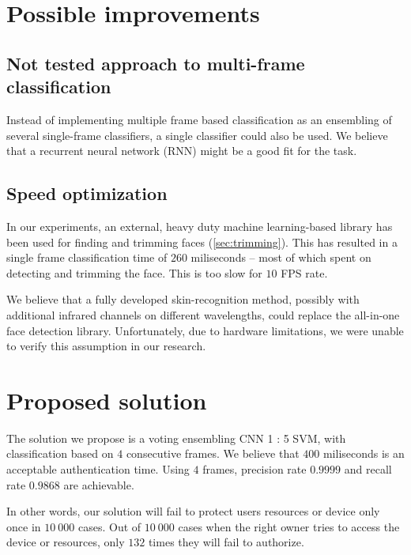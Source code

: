     \section*{Possible improvements}

    \subsection*{Not tested approach to multi-frame classification}
    Instead of implementing multiple frame based classification as an ensembling
    of several single-frame classifiers, a single classifier could also be used.
    We believe that a recurrent neural network (RNN) might be a good fit for the
    task.

    \subsection*{Speed optimization}
    In our experiments, an external, heavy duty machine learning-based library
    has been used for finding and trimming faces (\ref{sec:trimming}). This has
    resulted in a single frame classification time of $260$ miliseconds -- most of
    which spent on detecting and trimming the face. This is too slow for $10$ FPS
    rate.

    We believe that a fully developed skin-recognition method, possibly with
    additional infrared channels on different wavelengths, could replace the
    all-in-one face detection library. Unfortunately, due to hardware limitations,
    we were unable to verify this assumption in our research.

    \section{Proposed solution}
    The solution we propose is a voting ensembling CNN 1 : 5 SVM, with
    classification based on $4$ consecutive frames. We believe that $400$ miliseconds
    is an acceptable authentication time. Using $4$ frames, precision rate $0.9999$
    and recall rate $0.9868$ are achievable.

    In other words, our solution will fail to protect users resources or device
    only once in $10\ 000$ cases. Out of $10\ 000$ cases when the right owner
    tries to access the device or resources, only $132$ times they will fail
    to authorize.
